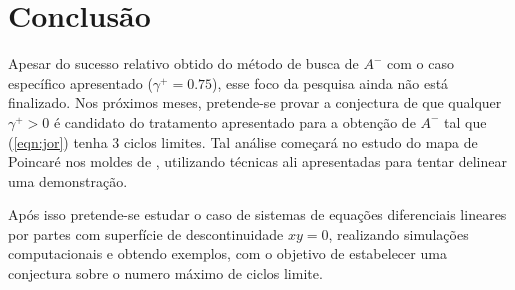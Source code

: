 \section{Conclusão}
Apesar do sucesso relativo obtido do método de busca de $A^-$ com o caso específico apresentado ($\gamma^+=0.75$), esse foco da pesquisa ainda não está finalizado. Nos próximos meses, pretende-se provar a conjectura de que qualquer $\gamma^+>0$ é candidato do tratamento apresentado para a obtenção de $A^-$ tal que (\ref{eqn:jor}) tenha 3 ciclos limites. Tal análise começará no estudo do mapa de Poincaré nos moldes de \cite{Huan:etal:2012}, utilizando técnicas ali apresentadas para tentar delinear uma demonstração.

Após isso pretende-se estudar o caso de sistemas de equações diferenciais lineares por partes com superfície de descontinuidade $xy=0$, realizando simulações computacionais e obtendo exemplos, com o objetivo
de estabelecer uma conjectura sobre o numero máximo de ciclos limite.
